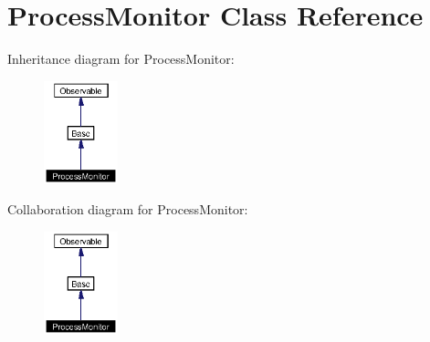 \section{Process\-Monitor Class Reference}
\label{classProcessMonitor}
Inheritance diagram for Process\-Monitor:\begin{figure}[H]
\begin{center}
\leavevmode
\includegraphics[width=61pt]{classProcessMonitor__inherit__graph}
\end{center}
\end{figure}
Collaboration diagram for Process\-Monitor:\begin{figure}[H]
\begin{center}
\leavevmode
\includegraphics[width=61pt]{classProcessMonitor__coll__graph}
\end{center}
\end{figure}
